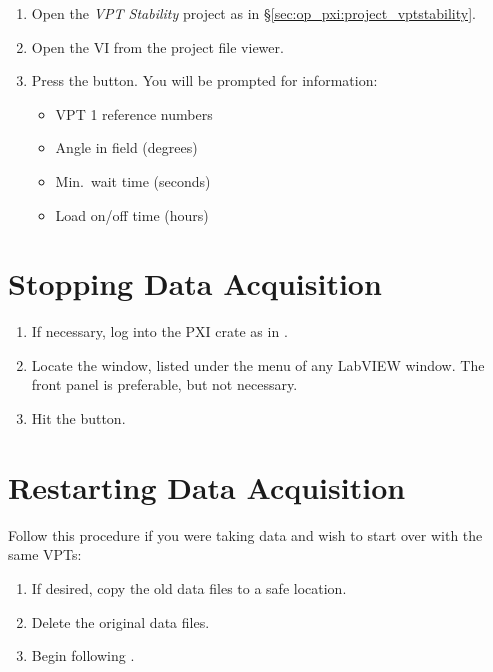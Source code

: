 \begin{enumerate}
\item Open the \textit{VPT Stability} project as in \S\ref{sec:op_pxi:project_vptstability}.
\item Open the  VI from the project file viewer.
\item Press the   button.  You will be prompted for information:
  \begin{itemize}
  \item VPT 1 reference numbers
  \item Angle in field (degrees)
  \item Min.\ wait time (seconds)
  \item Load on/off time (hours)
  \end{itemize}
\end{enumerate}

\section{Stopping Data Acquisition}
\label{sec:op_pxi:daq_stop}
\begin{enumerate}
\item If necessary, log into the PXI crate as in .
\item Locate the  window, listed under the  menu of any LabVIEW window.  The front panel is preferable, but not necessary.
\item Hit the   button.
\end{enumerate}

\section{Restarting Data Acquisition}
\label{sec:op_pxi:daq_restart}

Follow this procedure if you were taking data and wish to start over with the same VPTs:
\begin{enumerate}
\item If desired, copy the old data files to a safe location.
\item Delete the original data files.
\item Begin following .
\end{enumerate}

